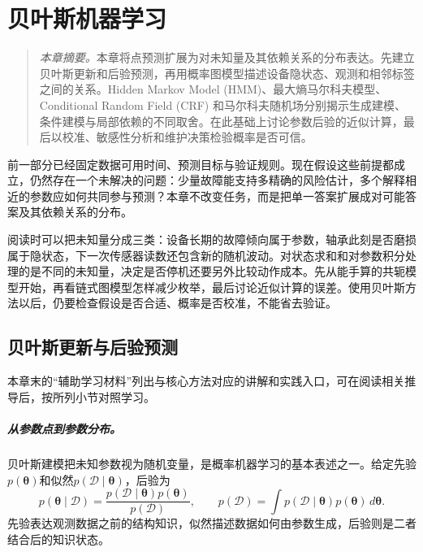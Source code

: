 ﻿\chapter{贝叶斯机器学习}
\begin{quote}\small
\textit{本章摘要。}本章将点预测扩展为对未知量及其依赖关系的分布表达。先建立贝叶斯更新和后验预测，再用概率图模型描述设备隐状态、观测和相邻标签之间的关系。Hidden Markov Model (HMM)、最大熵马尔科夫模型、Conditional Random Field (CRF) 和马尔科夫随机场分别揭示生成建模、条件建模与局部依赖的不同取舍。在此基础上讨论参数后验的近似计算，最后以校准、敏感性分析和维护决策检验概率是否可信。
\end{quote}
前一部分已经固定数据可用时间、预测目标与验证规则。现在假设这些前提都成立，仍然存在一个未解决的问题：少量故障能支持多精确的风险估计，多个解释相近的参数应如何共同参与预测？本章不改变任务，而是把单一答案扩展成对可能答案及其依赖关系的分布。

阅读时可以把未知量分成三类：设备长期的故障倾向属于参数，轴承此刻是否磨损属于隐状态，下一次传感器读数还包含新的随机波动。对状态求和和对参数积分处理的是不同的未知量，决定是否停机还要另外比较动作成本。先从能手算的共轭模型开始，再看链式图模型怎样减少枚举，最后讨论近似计算的误差。使用贝叶斯方法以后，仍要检查假设是否合适、概率是否校准，不能省去验证。

\section{贝叶斯更新与后验预测}

本章末的“辅助学习材料”列出与核心方法对应的讲解和实践入口，可在阅读相关推导后，按所列小节对照学习。

\paragraph{从参数点到参数分布。}
贝叶斯建模把未知参数视为随机变量，是概率机器学习的基本表述之一\cite{murphy2022pml,bishop2006pattern}。给定先验$p(\bm{\theta})$和似然$p(\mathcal{D}\mid\bm{\theta})$，后验为
\begin{equation}
 p(\bm{\theta}\mid\mathcal{D})=\frac{p(\mathcal{D}\mid\bm{\theta})p(\bm{\theta})}{p(\mathcal{D})},
 \qquad p(\mathcal{D})=\int p(\mathcal{D}\mid\bm{\theta})p(\bm{\theta})\,d\bm{\theta}.
\end{equation}
先验表达观测数据之前的结构知识，似然描述数据如何由参数生成，后验则是二者结合后的知识状态。

